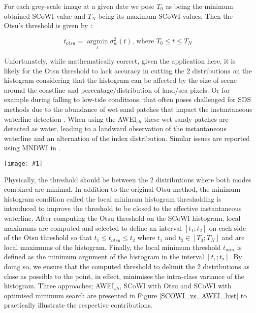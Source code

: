 \documentclass[remotesensing,article,submit,pdftex,moreauthors]{Definitions/mdpi}
\newcommand{\myfigure}[4]{
    \begin{figure*}[ht!]
        \centering
        \texttt{[image: \#1]}	 
        \caption{\itshape#2}
        \label{#3}
    \end{figure*} 
}
\begin{document}
For each grey-scale image at a given date we pose $T_0$ as being the minimum obtained SCoWI value and $T_N$ being its maximum SCoWI values. Then the Otsu's threshold is given by :

\begin{equation}
    t_{otsu} = \operatorname*{argmin}_t \sigma_w^2(t) \text{, where }T_0 \le t \le T_N
\end{equation}

Unfortunately, while mathematically correct, given the application here, it is likely for the Otsu threshold to lack accuracy in cutting the 2 distributions on the histogram considering that the histogram can be affected by the size of scene around the coastline and percentage/distribution of land/sea pixels. Or for example during falling to low-tide conditions, that often poses challenged for SDS methods due to the abundance of wet sand patches that impact the instantaneous waterline detection \citep{CASTELLE2021107707}. When using the AWEI$_{sh}$ these wet sandy patches are detected as water, leading to a landward observation of the instantaneous waterline and an alternation of the index distribution. Similar issues are reported using MNDWI in \citet{VOS2019_sub}. 

\myfigure{img/AWEIsh_vs_SCOWI_crop.png}{a) AWEI$_{sh}$ histogram of this Sentinel-2 acquisition. The dashed blue line is the Otsu threshold value computed for this histogram. b) SCoWI histogram of this Sentinel-2 acquisition in which the dashed green line indicates the Otsu threshold value while the dashed red line shows the position of the local histogram minimum. c) Sentinel-2 acquisition at Capbreton, French Atlantic coast during low tide. Instantaneous waterlines are extracted through the 3 methods: cyan is AWEI$_{sh}$, green represents the SCoWI with Otsu and red shows the SCoWI with local minimum approach. Waterline extracted by the SCoWI combined to the local minimum histogram thresholding method (red line) is the closest to the actual waterline on the acquisition. }{SCOWI_vs_AWEI_hist}{0.8}

Physically, the threshold should be between the 2 distributions where both modes combined are minimal. In addition to the original Otsu method, the minimum histogram condition called the local minimum histogram thresholding is introduced to improve the threshold to be closed to the effective instantaneous waterline. After computing the Otsu threshold on the SCoWI histogram, local maximums are computed and selected to define an interval $[t_1 ; t_2]$ on each side of the Otsu threshold so that $t_1 \le t_{otsu} \le t_2$ where $t_1$ and $t_2 \in [T_0;T_N]$ and are local maximums of the histogram. Finally, the local minimum threshold $t_{min}$ is defined as the minimum argument of the histogram in the interval $[t_1 ; t_2]$. By doing so, we ensure that the computed threshold to delimit the 2 distributions as close as possible to the point, in effect, minimises the intra-class variance of the histogram. Three approaches; AWEI$_{sh}$, SCoWI with Otsu and SCoWI with optimised minimum search are presented in Figure \ref{SCOWI_vs_AWEI_hist} to practically illustrate the respective contributions.
\end{document}

